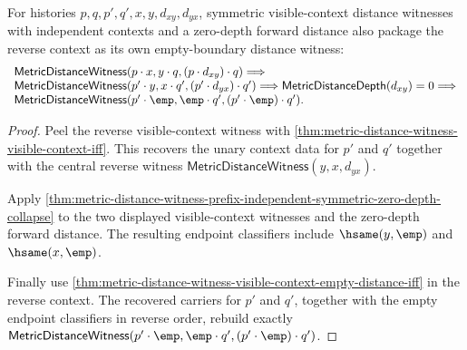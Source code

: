 \begin{theorem}
\label{thm:metric-prefix-independent-symmetric-zero-depth-reverse-empty-boundary}
For histories $p,q,p',q',x,y,d_{xy},d_{yx}$, symmetric visible-context
distance witnesses with independent contexts and a zero-depth forward distance
also package the reverse context as its own empty-boundary distance witness:
$$
\begin{array}{l}
\mathsf{MetricDistanceWitness}(p\cdot x,y\cdot q,(p\cdot d_{xy})\cdot q)
\Longrightarrow
\\
\mathsf{MetricDistanceWitness}(p'\cdot y,x\cdot q',(p'\cdot d_{yx})\cdot q')
\Longrightarrow
\mathsf{MetricDistanceDepth}(d_{xy})=0
\Longrightarrow
\\
\mathsf{MetricDistanceWitness}(p'\cdot\emp,\emp\cdot q',
(p'\cdot\emp)\cdot q').
\end{array}
$$
\end{theorem}
\begin{proof}
Peel the reverse visible-context witness with
\autoref{thm:metric-distance-witness-visible-context-iff}. This recovers the
unary context data for $p'$ and $q'$ together with the central reverse witness
$\mathsf{MetricDistanceWitness}(y,x,d_{yx})$.

Apply
\autoref{thm:metric-distance-witness-prefix-independent-symmetric-zero-depth-collapse}
to the two displayed visible-context witnesses and the zero-depth forward
distance. The resulting endpoint classifiers include $\hsame(y,\emp)$ and
$\hsame(x,\emp)$.

Finally use
\autoref{thm:metric-distance-witness-visible-context-empty-distance-iff} in the
reverse context. The recovered carriers for $p'$ and $q'$, together with the
empty endpoint classifiers in reverse order, rebuild exactly
$\mathsf{MetricDistanceWitness}(p'\cdot\emp,\emp\cdot q',(p'\cdot\emp)\cdot q')$.
\end{proof}

